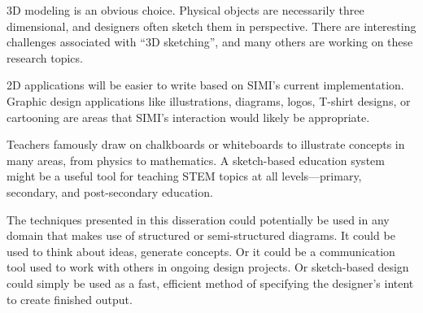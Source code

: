 3D modeling is an obvious choice. Physical objects are necessarily
three dimensional, and designers often sketch them in
perspective. There are interesting challenges associated with ``3D
sketching'', and many others are working on these research topics.

2D applications will be easier to write based on SIMI's current
implementation. Graphic design applications like illustrations,
diagrams, logos, T-shirt designs, or cartooning are areas that SIMI's
interaction would likely be appropriate.

Teachers famously draw on chalkboards or whiteboards to illustrate
concepts in many areas, from physics to mathematics. A sketch-based
education system might be a useful tool for teaching STEM topics at
all levels---primary, secondary, and post-secondary education.

The techniques presented in this disseration could potentially be used
in any domain that makes use of structured or semi-structured
diagrams. It could be used to think about ideas, generate concepts. Or
it could be a communication tool used to work with others in ongoing
design projects. Or sketch-based design could simply be used as a
fast, efficient method of specifying the designer's intent to create
finished output.


